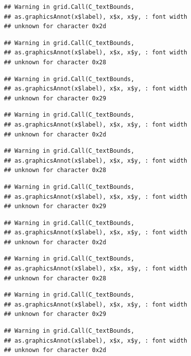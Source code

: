\documentclass[
]{book}
\begin{document}
\begin{verbatim}
## Warning in grid.Call(C_textBounds,
## as.graphicsAnnot(x$label), x$x, x$y, : font width
## unknown for character 0x2d
\end{verbatim}

\begin{verbatim}
## Warning in grid.Call(C_textBounds,
## as.graphicsAnnot(x$label), x$x, x$y, : font width
## unknown for character 0x28
\end{verbatim}

\begin{verbatim}
## Warning in grid.Call(C_textBounds,
## as.graphicsAnnot(x$label), x$x, x$y, : font width
## unknown for character 0x29
\end{verbatim}

\begin{verbatim}
## Warning in grid.Call(C_textBounds,
## as.graphicsAnnot(x$label), x$x, x$y, : font width
## unknown for character 0x2d
\end{verbatim}

\begin{verbatim}
## Warning in grid.Call(C_textBounds,
## as.graphicsAnnot(x$label), x$x, x$y, : font width
## unknown for character 0x28
\end{verbatim}

\begin{verbatim}
## Warning in grid.Call(C_textBounds,
## as.graphicsAnnot(x$label), x$x, x$y, : font width
## unknown for character 0x29
\end{verbatim}

\begin{verbatim}
## Warning in grid.Call(C_textBounds,
## as.graphicsAnnot(x$label), x$x, x$y, : font width
## unknown for character 0x2d
\end{verbatim}

\begin{verbatim}
## Warning in grid.Call(C_textBounds,
## as.graphicsAnnot(x$label), x$x, x$y, : font width
## unknown for character 0x28
\end{verbatim}

\begin{verbatim}
## Warning in grid.Call(C_textBounds,
## as.graphicsAnnot(x$label), x$x, x$y, : font width
## unknown for character 0x29
\end{verbatim}

\begin{verbatim}
## Warning in grid.Call(C_textBounds,
## as.graphicsAnnot(x$label), x$x, x$y, : font width
## unknown for character 0x2d
\end{verbatim}
\end{document}
